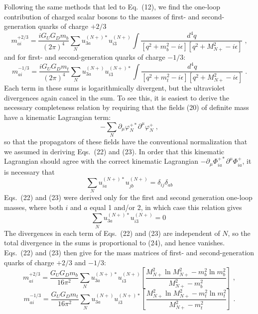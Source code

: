   Following the same methods that led to Eq.~(12), we find the one-loop contribution of charged scalar bosons to the masses of first- and second-generation quarks of charge $+2/3$
\begin{equation}
m^{+2/3}_{ai}=\frac{iG_UG_Dm_b}{(2\pi)^4}\sum_{N}  u_{3a}^{(N+)*}u_{i3}^{(N+)} \int \frac{d^4q}{[q^2+m_b^2-i\epsilon][q^2+M_{N+}^2-i\epsilon]}\;,
\end{equation}
and for first- and second-generation quarks of charge $-1/3$:
\begin{equation}
m^{-1/3}_{ai}=\frac{iG_UG_Dm_t}{(2\pi)^4}\sum_{N}  u_{3a}^{(N+)}u_{i3}^{(N+)*} \int \frac{d^4q}{[q^2+m_t^2-i\epsilon][q^2+M_{N+}^2-i\epsilon]}\;.
\end{equation}
Each term in these sums is logarithmically divergent, but the ultraviolet divergences again cancel in the sum.  To see this, it  is easiest to derive the necessary completeness relation by  requiring that the fields (20) of definite mass have a kinematic Lagrangian term: 
$$-\sum_N\partial_\mu\varphi^{+*}_N\partial^\mu\varphi^+_N\;,$$
so that the propagators of these fields have the conventional normalization that we assumed in deriving Eqs.~(22) and (23).  In order that this kinematic Lagrangian should agree with the correct kinematic Lagrangian $-\partial_\mu\Phi^{+*}_{ia}\partial^\mu\Phi^{+}_{ia}$, it is necessary that
$$
\sum_{N}  u_{ia}^{(N+)*}u_{jb}^{(N+)}=\delta_{ij}\delta_{ab}
$$
Eqs.~(22) and (23) were derived only for the first and second generation one-loop masses,  where both $i$ and $a$ equal 1 and/or 2, in which case this relation  gives
\begin{equation}
\sum_{N}  u_{3a}^{(N+)*}u_{i3}^{(N+)}=0\;
\end{equation}
The divergences in each term of Eqs.~(22) and (23) are independent of $N$, so the total divergence in the sums is proportional to (24), and hence vanishes.
Eqs.~(22) and (23) then give for the mass matrices of first- and second-generation quarks of charge $+2/3$ and $-1/3$:
\begin{equation}
m^{+2/3}_{ai}=\frac{G_UG_Dm_b}{16\pi^2}\sum_{N}  u_{3a}^{(N+)*}u_{i3}^{(N+)}\left[\frac{M_{N+}^2\ln M_{N+}^2-m_b^2\ln m_b^2}{M_{N+}^2-m_b^2}
\right] \;,
\end{equation}
\begin{equation}
m^{-1/3}_{ai}=\frac{G_UG_Dm_t}{16 \pi^2}\sum_{N}  u_{3a}^{(N+)}u_{i3}^{(N+)*}\left[\frac{M_{N+}^2\ln M_{N+}^2-m_t^2\ln m_t^2}{M_{N+}^2-m_t^2}\right]
 \;.
\end{equation}




